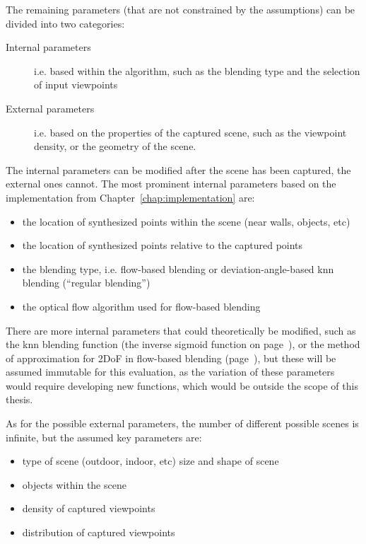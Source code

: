 The remaining parameters (that are not constrained by the assumptions) can be divided into two categories: 
\begin{description}
    \item [Internal parameters] i.e. based within the algorithm, such as the blending type and the selection of input viewpoints
    \item [External parameters] i.e. based on the properties of the captured scene, such as the viewpoint density, or the geometry of the scene.
\end{description}      

The internal parameters can be modified after the scene has been captured, the external ones cannot.  The most prominent internal parameters based on the implementation from Chapter~\ref{chap:implementation} are:

\begin{itemize}
  \item the location of synthesized points within the scene (near walls, objects, etc)
  \item the location of synthesized points relative to the captured points
  \item the blending type, i.e. flow-based blending or deviation-angle-based knn blending (``regular blending'')
  \item the optical flow algorithm used for flow-based blending
\end{itemize}

There are more internal parameters that could theoretically be modified, such as the knn blending function (the inverse sigmoid function on page~\pageref{eq:sigmoid}), or the method of approximation for 2DoF in flow-based blending (page~\pageref{subsec:2dof_flow-based}), but these will be assumed immutable for this evaluation, as the variation of these parameters would require developing new functions, which would be outside the scope of this thesis.

As for the possible external parameters, the number of different possible scenes is infinite, but the assumed key parameters are:
\begin{itemize}
  \item type of scene (outdoor, indoor, etc) \ar size and shape of scene
  \item objects within the scene
  \item density of captured viewpoints
  \item distribution of captured viewpoints
\end{itemize}

